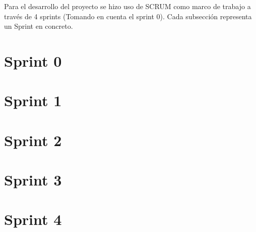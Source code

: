 


Para el desarrollo del proyecto se hizo uso de SCRUM \cite{SCRUM} como marco de trabajo a través de 4 sprints \cite{SCRUM-Sprints} (Tomando en cuenta el sprint 0). Cada subsección representa un Sprint en concreto. 

\section{Sprint 0}
\label{chapter02-section02-sprint0}


\section{Sprint 1}
\label{chapter02-section02-sprint1}



\section{Sprint 2}
\label{chapter02-section02-sprint2}



\section{Sprint 3}
\label{chapter02-section02-sprint3}



\section{Sprint 4}
\label{chapter02-section02-sprint4}

